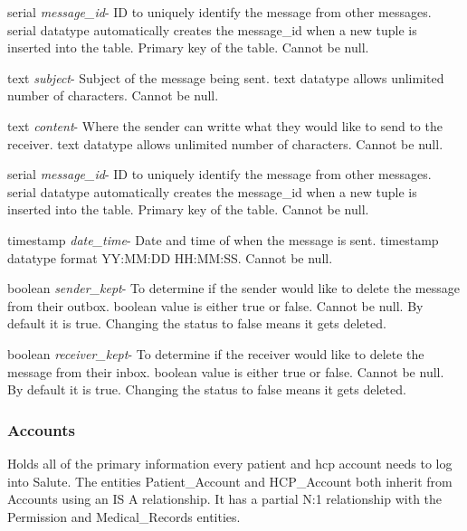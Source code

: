 \documentclass[12pt]{report}
\begin{document}
\begin{description}
\item serial \textit{message\_id}- ID to uniquely identify the message from other messages. serial datatype automatically creates the message\_id when a new tuple is inserted into the table.  Primary key of the table.  Cannot be null.
\item text \textit{subject}- Subject of the message being sent. text datatype allows unlimited number of characters.  Cannot be null.
\item text \textit{content}- Where the sender can writte what they would like to send to the receiver.  text datatype allows unlimited number of characters.  Cannot be null.
\item serial \textit{message\_id}- ID to uniquely identify the message from other messages. serial datatype automatically creates the message\_id when a new tuple is inserted into the table.  Primary key of the table.  Cannot be null.
\item timestamp \textit{date\_time}- Date and time of when the message is sent.  timestamp datatype format YY:MM:DD HH:MM:SS.  Cannot be null.
\item boolean \textit{sender\_kept}- To determine if the sender would like to delete the message from their outbox.  boolean value is either true or false.  Cannot be null.  By default it is true.  Changing the status to false means it gets deleted.
\item boolean \textit{receiver\_kept}- To determine if the receiver would like to delete the message from their inbox.  boolean value is either true or false.  Cannot be null.  By default it is true.  Changing the status to false means it gets deleted.
\end{description}

\subsubsection{Accounts}
Holds all of the primary information every patient and hcp account needs to log into Salute.  The entities Patient\_Account and HCP\_Account both inherit from Accounts using an IS A relationship.  It has a partial N:1 relationship with the Permission and Medical\_Records entities.
\end{document}
